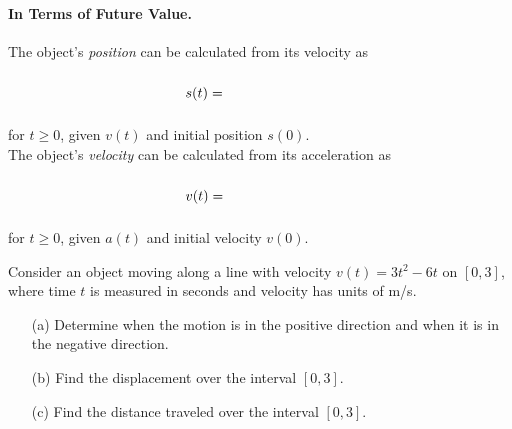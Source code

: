 \documentclass[12pt]{article}
\begin{document}

\vspace{5mm}


\vspace{5mm}


\vspace{5mm}


\vspace{45mm}

\paragraph{In Terms of Future Value.} The object's \textit{position} can be calculated from its velocity as

$$s(t)=\phantom{\large{s(0)+\int_0^t v(x)\,dx}}$$

\vspace{1mm}

for $t\geq 0$, given $v(t)$ and initial position $s(0)$.\\

The object's \textit{velocity} can be calculated from its acceleration as

$$v(t)=\phantom{\large{v(0)+\int_0^t a(x)\,dx}}$$

\vspace{1mm}

for $t\geq 0$, given $a(t)$ and initial velocity $v(0)$.

\newpage


\Example Consider an object moving along a line with velocity $v(t)=3t^2-6t$ on $[0,3]$, where time $t$ is measured in seconds and velocity has units of m/s.

\begin{enumerate}
\item[(a)] Determine when the motion is in the positive direction and when it is in the negative direction.

\vspace{60mm}

\item[(b)] Find the displacement over the interval $[0,3]$.

\vspace{60mm}

\item[(c)] Find the distance traveled over the interval $[0,3]$.

\end{enumerate}
\end{document}
